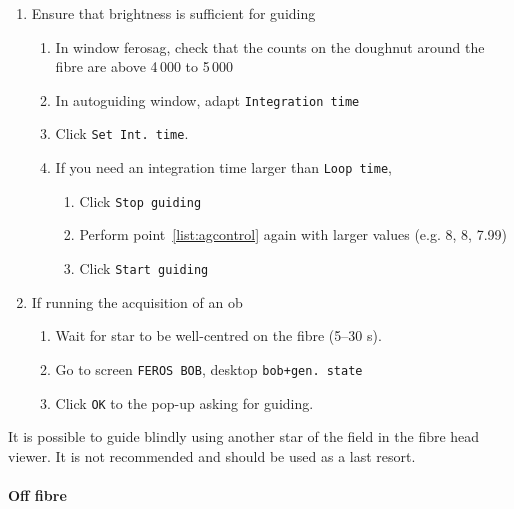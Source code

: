 \documentclass[11pt,fleqn,a4paper]{book}
\begin{document}
\begin{enumerate}
    \item Ensure that brightness is sufficient for guiding
    \begin{enumerate}
        \item In window \gls{ferosag}, check that the counts on the doughnut around the fibre are above 4\,000 to 5\,000
        \item In \gls{autoguiding} window, adapt \texttt{Integration time}
        \item Click \texttt{Set Int. time}. 
        \item If you need an integration time larger than \texttt{Loop time},
            \begin{enumerate}
                \item Click \texttt{Stop guiding}
                \item Perform point~\ref{list:agcontrol} again with larger values (e.g. 8, 8, 7.99)
                \item Click \texttt{Start guiding}
            \end{enumerate}
    \end{enumerate}
    \item If running the \gls{acquisition} of an \gls{ob}
    \begin{enumerate}
        \item Wait for star to be well-centred on the fibre (5--30 s).
        \item Go to screen \texttt{FEROS BOB}, \gls{desktop} \texttt{bob+gen. state}
        \item Click \texttt{OK} to the pop-up asking for guiding.
    \end{enumerate}
\end{enumerate}

It is possible to guide blindly using another star of the field in the fibre head viewer.  It is not recommended and should be used as a last resort.

\paragraph{Off fibre}
\end{document}
